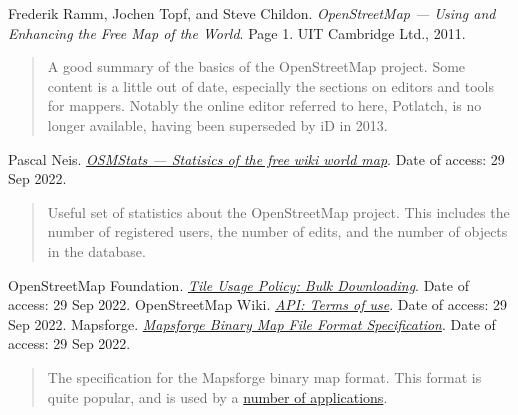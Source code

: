 \documentclass[]{final_report}
\begin{document}
\newpage
\begin{thebibliography}{99}
 Frederik Ramm, Jochen Topf, and Steve Childon. \emph{OpenStreetMap --- Using and Enhancing the Free Map of the World}. Page 1. UIT Cambridge Ltd., 2011.
\begin{quote}
    A good summary of the basics of the OpenStreetMap project. Some content is a little out of date, especially the sections on editors and tools for mappers. Notably the online editor referred to here, Potlatch, is no longer available, having been superseded by iD in 2013. 
\end{quote}
 Pascal Neis. \emph{\href{https://osmstats.neis-one.org/?item=members}{OSMStats --- Statisics of the free wiki world map}}. Date of access: 29 Sep 2022.
\begin{quote}
    Useful set of statistics about the OpenStreetMap project. This includes the number of registered users, the number of edits, and the number of objects in the database.
\end{quote}
 OpenStreetMap Foundation. \emph{\href{https://operations.osmfoundation.org/policies/tiles/\#bulk-downloading}{Tile Usage Policy: Bulk Downloading}}. Date of access: 29 Sep 2022.
 OpenStreetMap Wiki. \emph{\href{https://wiki.openstreetmap.org/wiki/API\#Terms_of_use}{API: Terms of use}}. Date of access: 29 Sep 2022.
 Mapsforge. \emph{\href{https://github.com/mapsforge/mapsforge/blob/master/docs/Specification-Binary-Map-File.md}{Mapsforge Binary Map File Format Specification}}. Date of access: 29 Sep 2022.
\begin{quote}
    The specification for the Mapsforge binary map format. This format is quite popular, and is used by a \href{https://github.com/mapsforge/mapsforge/blob/master/docs/Mapsforge-Applications.md}{number of applications}.
\end{quote}

\end{thebibliography}
\label{endpage}
\end{document}
